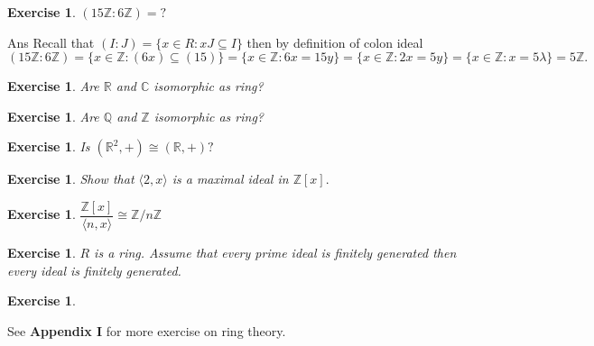 \documentclass[11pt]{amsart}
\newtheorem{ex}[theorem]{Exercise}
\newcommand{\QQ}{\mathbb Q}
\newcommand{\ZZ}{\mathbb Z}
\newcommand{\CC}{\mathbb C}
\newcommand{\RR}{\mathbb R}
\begin{document}
\begin{ex}
$(15{\ZZ}:6{\ZZ})=?$
\end{ex}
Ans Recall that $(I:J)=\{x\in R:xJ\subseteq I\}$ then by definition of colon ideal $(15{\ZZ}:6{\ZZ})=\{x\in {\ZZ}:(6x)\subseteq (15)\}=\{x\in {\ZZ}:6x=15y\}=\{x\in {\ZZ}:2x=5y\}=\{x\in {\ZZ}:x=5\lambda\}=5{\ZZ}.$
\begin{ex}
Are ${\RR}$ and ${\CC}$ isomorphic as ring?
\end{ex}
\begin{ex}
Are ${\QQ}$ and ${\ZZ}$ isomorphic as ring?
\end{ex}
\begin{ex}
Is $({\RR}^2,+)\cong ({\RR},+)?$
\end{ex}
\begin{ex}
Show that $\langle 2,x\rangle$ is a maximal ideal in ${\ZZ}[x].$
\end{ex}
\begin{ex}
$\dfrac{{\ZZ}[x]}{\langle n,x\rangle}\cong {\ZZ}/n{\ZZ}$
\end{ex}
\begin{ex}
$R$ is a ring. Assume that every prime ideal is finitely generated then every ideal is finitely generated.
\end{ex}
\begin{ex}

\end{ex}
See \textbf{Appendix I} for more exercise on ring theory.
\end{document}
